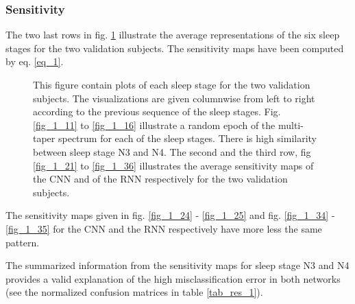 %

\subsubsection{Sensitivity}

The two last rows in fig. \ref{fig_1} illustrate the average representations of the six sleep stages for the two validation subjects. The sensitivity maps have been computed by eq. \ref{eq_1}.

\begin{figure*}[th!]
\centering

\caption{This figure contain plots of each sleep stage for the two validation subjects. The visualizations are given columnwise from left to right according to the previous sequence of the sleep stages. Fig. \ref{fig_1_11} to \ref{fig_1_16} illustrate a random epoch of the multi-taper spectrum for each of the sleep stages. There is high similarity between sleep stage N3 and N4.
The second and the third row, fig \ref{fig_1_21} to \ref{fig_1_36} illustrates the average sensitivity maps of the CNN and of the RNN respectively for the two validation subjects.}
\label{fig_1}
\end{figure*}

The sensitivity maps given in fig. \ref{fig_1_24} - \ref{fig_1_25} and fig. \ref{fig_1_34} - \ref{fig_1_35} for the CNN and the RNN respectively have more less the same pattern. 

The summarized information from the sensitivity maps for sleep stage N3 and N4 provides a valid explanation of the high misclassification error in both networks (see the normalized confusion matrices in table \ref{tab_res_1}).

